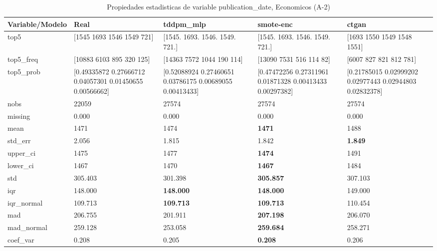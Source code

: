 \begin{table}[H]
\centering
\fontsize{8}{14}\selectfont
\caption{Propiedades  estadisticas de variable publication\_date, Economicos (A-2)}
\label{table-stats-economicos-a-2-publication_date}
\begin{tabular}{|l|m{10em}|m{10em}|m{10em}|m{10em}|}
\hline
 \rowcolor[gray]{0.8}
Variable/Modelo & Real & tddpm\_mlp & smote-enc & ctgan \\
\hline top5 & [1545 1693 1546 1549  721] & [1545. 1693. 1546. 1549.  721.] & [1545. 1693. 1546. 1549.  721.] & [1693 1550 1549 1548 1551] \\
\hline top5\_freq & [10883  6103   895   320   125] & [14363  7572  1044   190   114] & [13090  7531   516   114    82] & [6007  827  821  812  781] \\
\hline top5\_prob & [0.49335872 0.27666712 0.04057301 0.01450655 0.00566662] & [0.52088924 0.27460651 0.03786175 0.00689055 0.00413433] & [0.47472256 0.27311961 0.01871328 0.00413433 0.00297382] & [0.21785015 0.02999202 0.02977443 0.02944803 0.02832378] \\
\hline nobs & 22059 & 27574 & 27574 & 27574 \\
\hline missing & 0.000 & 0.000 & 0.000 & 0.000 \\
\hline mean & 1471 & 1474 & \bfseries 1471 & \cellcolor[rgb]{0.9, 0.54, 0.52} 1488 \\
\hline std\_err & 2.056 & \cellcolor[rgb]{0.9, 0.54, 0.52} 1.815 & 1.842 & \bfseries 1.849 \\
\hline upper\_ci & 1475 & 1477 & \bfseries 1474 & \cellcolor[rgb]{0.9, 0.54, 0.52} 1491 \\
\hline lower\_ci & 1467 & 1470 & \bfseries 1467 & \cellcolor[rgb]{0.9, 0.54, 0.52} 1484 \\
\hline std & 305.403 & \cellcolor[rgb]{0.9, 0.54, 0.52} 301.398 & \bfseries 305.857 & 307.103 \\
\hline iqr & 148.000 & \bfseries 148.000 & \bfseries 148.000 & \cellcolor[rgb]{0.9, 0.54, 0.52} 149.000 \\
\hline iqr\_normal & 109.713 & \bfseries 109.713 & \bfseries 109.713 & \cellcolor[rgb]{0.9, 0.54, 0.52} 110.454 \\
\hline mad & 206.755 & \cellcolor[rgb]{0.9, 0.54, 0.52} 201.911 & \bfseries 207.198 & 206.070 \\
\hline mad\_normal & 259.128 & \cellcolor[rgb]{0.9, 0.54, 0.52} 253.058 & \bfseries 259.684 & 258.271 \\
\hline coef\_var & 0.208 & \cellcolor[rgb]{0.9, 0.54, 0.52} 0.205 & \bfseries 0.208 & 0.206 \\

\end{tabular}
\end{table}
